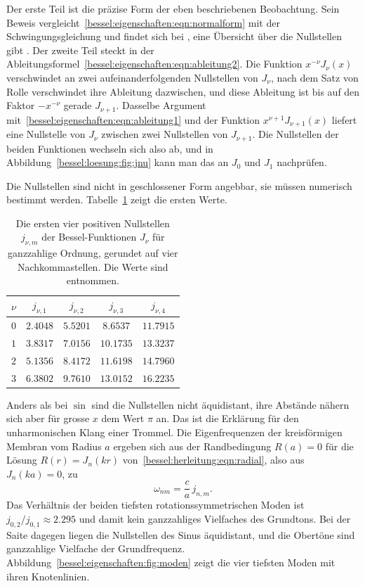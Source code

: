 Der erste Teil ist die präzise Form der eben beschriebenen Beobachtung.
Sein Beweis vergleicht~\eqref{bessel:eigenschaften:eqn:normalform} mit der Schwingungsgleichung und findet sich bei \cite[Kapitel~XV]{bessel:watson}, eine Übersicht über die Nullstellen gibt \cite[Abschnitt~10.21]{bessel:dlmf}.
Der zweite Teil steckt in der Ableitungsformel~\eqref{bessel:eigenschaften:eqn:ableitung2}.
%
Die Funktion $x^{-\nu}J_\nu(x)$ verschwindet an zwei aufeinanderfolgenden Nullstellen von $J_\nu$, nach dem Satz von Rolle verschwindet ihre Ableitung dazwischen, und diese Ableitung ist bis auf den Faktor $-x^{-\nu}$ gerade $J_{\nu+1}$.
Dasselbe Argument mit~\eqref{bessel:eigenschaften:eqn:ableitung1} und der Funktion $x^{\nu+1}J_{\nu+1}(x)$ liefert eine Nullstelle von $J_\nu$ zwischen zwei Nullstellen von $J_{\nu+1}$.
Die Nullstellen der beiden Funktionen wechseln sich also ab, und in Abbildung~\ref{bessel:loesung:fig:jnu} kann man das an $J_0$ und $J_1$ nachprüfen.

Die Nullstellen sind nicht in geschlossener Form angebbar, sie müssen numerisch bestimmt werden.
Tabelle~\ref{bessel:eigenschaften:tab:nullstellen} zeigt die ersten Werte.

\begin{table}
\centering
\caption{Die ersten vier positiven Nullstellen $j_{\nu,m}$ der Bessel-Funktionen $J_\nu$ für ganzzahlige Ordnung, gerundet auf vier Nachkommastellen.
Die Werte sind \cite[Abschnitt~9.5]{bessel:abramowitz} entnommen.
\label{bessel:eigenschaften:tab:nullstellen}}
\begin{tabular}{c|cccc}
$\nu$ & $j_{\nu,1}$ & $j_{\nu,2}$ & $j_{\nu,3}$ & $j_{\nu,4}$ \\
\hline
$0$ & $2.4048$ & $5.5201$ & $8.6537$ & $11.7915$ \\
$1$ & $3.8317$ & $7.0156$ & $10.1735$ & $13.3237$ \\
$2$ & $5.1356$ & $8.4172$ & $11.6198$ & $14.7960$ \\
$3$ & $6.3802$ & $9.7610$ & $13.0152$ & $16.2235$
\end{tabular}
\end{table}

Anders als bei $\sin$ sind die Nullstellen nicht äquidistant, ihre Abstände nähern sich aber für grosse $x$ dem Wert $\pi$ an.
Das ist die Erklärung für den unharmonischen Klang einer Trommel.
Die Eigenfrequenzen der kreisförmigen Membran vom Radius $a$ ergeben sich aus der Randbedingung $R(a)=0$ für die Lösung $R(r)=J_n(kr)$ von~\eqref{bessel:herleitung:eqn:radial}, also aus $J_n(ka)=0$, zu
\begin{equation}
\omega_{nm}
=
\frac{c}{a}\, j_{n,m}.
\label{bessel:eigenschaften:eqn:eigenfrequenzen}
\end{equation}
Das Verhältnis der beiden tiefsten rotationssymmetrischen Moden ist $j_{0,2}/j_{0,1}\approx 2.295$ und damit kein ganzzahliges Vielfaches des Grundtons.
Bei der Saite dagegen liegen die Nullstellen des Sinus äquidistant, und die Obertöne sind ganzzahlige Vielfache der Grundfrequenz.
Abbildung~\ref{bessel:eigenschaften:fig:moden} zeigt die vier tiefsten Moden mit ihren Knotenlinien.


